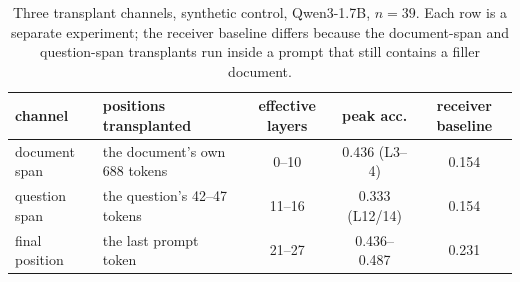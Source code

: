 \begin{table}[tbp]
\caption{The same depth sweep run a second time against the other receiver---a
single fixed wrong skill rather than each skill's own paired control---on the
same items. The two agree wherever the first is well behaved; the one bump in
the first run does not replicate.}
\label{tab:realspanfixed}
\centering
\small

\end{table}

\begin{table}[tbp]
\caption{The same arms over all forty items, unrestricted, after the instrument
fix. The six calculators this adds are ones the model can partly do without the
gold document: their receiver scores $0.375$, another skill's vector $0.667$ and
norm-matched noise $0.375$, against $0.000$, $0.188$ and $0.000$ on the four
that need the document. Pooling them raises the transfer arm from $\rho=0.19$
to $0.32$, which is why the main text reports the restricted set.}
\label{tab:battery-all}
\centering
\small

\end{table}

\begin{table}[tbp]
\caption{What the content vector contains once it is able to contain the
task---the numbers behind Figure~\ref{fig:skilltask}.}
\label{tab:skilltask}
\centering
\small

\end{table}


\label{app:tables}

\begin{table}[tbp]
\caption{Three transplant channels, synthetic control, Qwen3-1.7B, $n=39$.
Each row is a separate experiment; the receiver baseline differs because the
document-span and question-span transplants run inside a prompt that still
contains a filler document.}
\label{tab:windows}
\centering
\small
\begin{tabular}{llccc}
\toprule
\rowcolor{TableHeader}
channel & positions transplanted & effective layers & peak acc. & receiver baseline \\
\midrule
document span & the document's own 688 tokens & 0--10 & 0.436 (L3--4) & 0.154 \\
question span & the question's 42--47 tokens  & 11--16 & 0.333 (L12/14) & 0.154 \\
final position & the last prompt token        & 21--27 & 0.436--0.487 & 0.231 \\
\bottomrule
\end{tabular}
\end{table}


